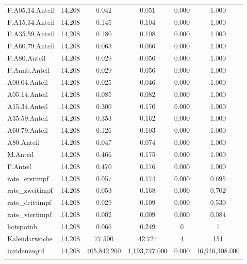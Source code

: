 \documentclass{article}
\begin{document}
\begin{table}[!htbp]
\begin{tabular}{@{\extracolsep{5pt}}lccccc}
F.A05.14.Anteil & 14,208 & 0.042 & 0.051 & 0.000 & 1.000 \\ 
F.A15.34.Anteil & 14,208 & 0.145 & 0.104 & 0.000 & 1.000 \\ 
F.A35.59.Anteil & 14,208 & 0.180 & 0.108 & 0.000 & 1.000 \\ 
F.A60.79.Anteil & 14,208 & 0.063 & 0.066 & 0.000 & 1.000 \\ 
F.A80.Anteil & 14,208 & 0.029 & 0.056 & 0.000 & 1.000 \\ 
F.Aunb.Anteil & 14,208 & 0.029 & 0.056 & 0.000 & 1.000 \\ 
A00.04.Anteil & 14,208 & 0.025 & 0.046 & 0.000 & 1.000 \\ 
A05.14.Anteil & 14,208 & 0.085 & 0.082 & 0.000 & 1.000 \\ 
A15.34.Anteil & 14,208 & 0.300 & 0.170 & 0.000 & 1.000 \\ 
A35.59.Anteil & 14,208 & 0.353 & 0.162 & 0.000 & 1.000 \\ 
A60.79.Anteil & 14,208 & 0.126 & 0.103 & 0.000 & 1.000 \\ 
A80.Anteil & 14,208 & 0.047 & 0.074 & 0.000 & 1.000 \\ 
M.Anteil & 14,208 & 0.466 & 0.175 & 0.000 & 1.000 \\ 
F.Anteil & 14,208 & 0.470 & 0.176 & 0.000 & 1.000 \\ 
rate\_erstimpf & 14,208 & 0.057 & 0.174 & 0.000 & 0.695 \\ 
rate\_zweitimpf & 14,208 & 0.053 & 0.168 & 0.000 & 0.702 \\ 
rate\_drittimpf & 14,208 & 0.029 & 0.109 & 0.000 & 0.530 \\ 
rate\_viertimpf & 14,208 & 0.002 & 0.009 & 0.000 & 0.084 \\ 
hotspotnb & 14,208 & 0.066 & 0.249 & 0 & 1 \\ 
Kalendarwoche & 14,208 & 77.500 & 42.724 & 4 & 151 \\ 
inzidenzsqrd & 14,208 & 405,842.200 & 1,193,747.000 & 0.000 & 16,946,308.000 \\ 
\hline \\[-1.8ex] 
\end{tabular} 
\end{table} 
\end{document}
